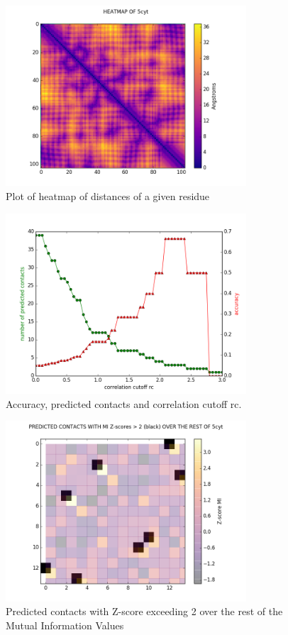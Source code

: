\documentclass[12pt]{article}
\begin{document}
\begin{figure}[h]
\centering
\includegraphics[width=0.8\textwidth]{figure5_heatmap_5cyt_d_CB.png}
\caption{Plot of heatmap of distances of a given residue}
\label{fig:HeatMap}
\end{figure}

\begin{figure}[h]
\centering
\includegraphics[width=0.8\textwidth]{figure6_accuracy_cutoffs_5cyt.png}
\caption{Accuracy, predicted contacts and correlation cutoff rc\cite{Gobel1994}.}
\label{fig:Accuracy}
\end{figure}

\begin{figure}[h]
\centering
\includegraphics[width=0.8\textwidth]{figure2_supermatrix_5cyt_p_CB.png}
\caption{Predicted contacts with Z-score exceeding 2 over the rest of the Mutual Information Values}
\label{fig:Supermatrix}
\end{figure}
\end{document}
